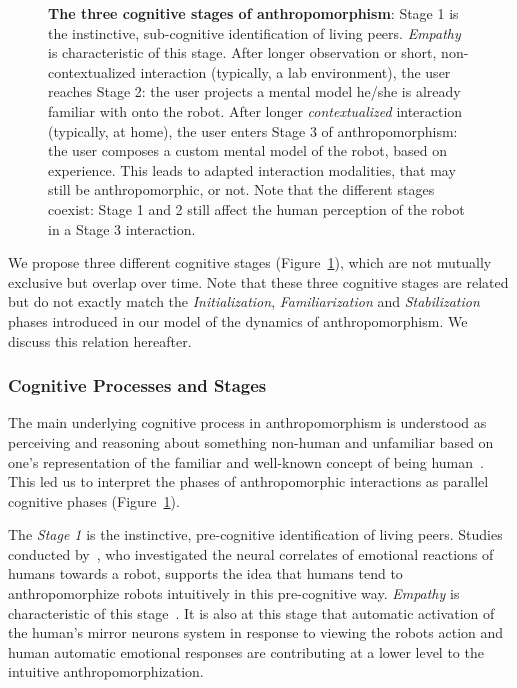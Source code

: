 \documentclass{frontiersSCNS} %
\begin{document}
\begin{figure}[htb]
\begin{tikzpicture}
\end{tikzpicture}
\caption{\textbf{The three cognitive stages of anthropomorphism}: Stage 1 is the instinctive,
sub-cognitive identification of living peers. {\it Empathy} is characteristic
of this stage. After longer observation or short, non-contextualized interaction
(typically, a lab environment), the user reaches Stage 2: the user projects a
mental model he/she is already familiar with onto the robot. After longer {\it
contextualized} interaction (typically, at home), the user enters Stage 3 of
anthropomorphism: the user composes a custom mental model of the robot,
based on experience. This leads to adapted interaction modalities, that may
still be anthropomorphic, or not. Note that the different stages coexist: Stage
1 and 2 still affect the human perception of the robot in a Stage 3 interaction.}
\label{fig:cognitivemodel}
\end{figure}

We propose three different cognitive stages (Figure~\ref{fig:cognitivemodel}),
which are not mutually exclusive but overlap over time. Note that these three
cognitive stages are related but do not exactly match the \emph{Initialization},
\emph{Familiarization} and \emph{Stabilization} phases introduced in our model
of the dynamics of anthropomorphism. We discuss this relation hereafter.


\subsubsection{Cognitive Processes and Stages\\}

The main underlying cognitive process in anthropomorphism is understood as
perceiving and reasoning about something non-human and unfamiliar based on one's
representation of the familiar and well-known concept of being
human~\citep{epley_when_2008}. This led us to interpret the phases of
anthropomorphic interactions as parallel cognitive phases
(Figure~\ref{fig:cognitivemodel}).

The \emph{Stage 1} is the instinctive, pre-cognitive identification of living
peers. Studies conducted by~\citet{rosenthal-vonderputten_experimental_2013},
who investigated the neural correlates of emotional reactions of humans towards
a robot, supports the idea that humans tend to anthropomorphize robots
intuitively in this pre-cognitive way. {\it Empathy} is characteristic of this
stage~\citep{rosenthalvonderPutten2013neural}.  It is also at this stage that
automatic activation of the human's mirror neurons system  in response to
viewing the robots action and human automatic emotional responses are
contributing at a lower level to the intuitive anthropomorphization.
\end{document}
